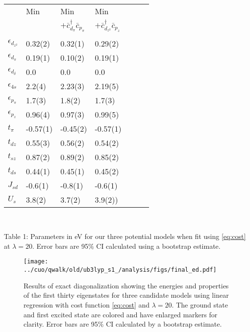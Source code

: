 \documentclass{article}
\begin{document}
\begin{table}[H]
\begin{center}
\begin{tabular}{l|llllll}
&Min & Min & Min \\
& & $ + \bar{c}_{d_\pi}^\dagger \bar{c}_{p_\pi}$ & $ + \bar{c}_{d_{z^2}}^\dagger \bar{c}_{p_z}$ \\ $\ $ \\ \hline 
$\epsilon_{d_{z^2}}$& 0.32(2)& 0.32(1)& 0.29(2)\\
$\epsilon_{d_\pi}$& 0.19(1)& 0.10(2)& 0.19(1)\\
$\epsilon_{d_\delta}$& 0.0 & 0.0 & 0.0\\
$\epsilon_{4s}$& 2.2(4)& 2.23(3)& 2.19(5)\\
$\epsilon_{p_\pi}$& 1.7(3)& 1.8(2)& 1.7(3)\\
$\epsilon_{p_z}$& 0.96(4)& 0.97(3)& 0.99(5)\\
$t_\pi$& -0.57(1)& -0.45(2)& -0.57(1)\\
$t_{dz}$& 0.55(3)& 0.56(2)& 0.54(2)\\
$t_{sz}$& 0.87(2)& 0.89(2)& 0.85(2)\\
$t_{ds}$& 0.44(1)& 0.45(1)& 0.45(2)\\
$J_{sd}$& -0.6(1)& -0.8(1)& -0.6(1)\\
$U_s$& 3.8(2)& 3.7(2)& 3.9(2))\\
\end{tabular}
\\ $\ $
\\
\end{center}
Table 1: Parameters in eV for our three potential models when fit using \eqref{eq:cost} at $\lambda = 20$. Error bars are 95\% CI calculated using a bootstrap estimate.
\end{table}

\begin{figure}[H]
\centering
\texttt{[image: ../cuo/qwalk/old/ub3lyp\_s1\_/analysis/figs/final\_ed.pdf]}
\caption{Results of exact diagonalization showing the energies and properties of the first thirty eigenstates for three candidate models using linear regression with cost function \ref{eq:cost} and $\lambda = 20$. The ground state and first excited state are colored and have enlarged markers for clarity. Error bars are 95\% CI calculated by a bootstrap estimate.}
\label{fig:FinalED}
\end{figure}	
\end{document}
